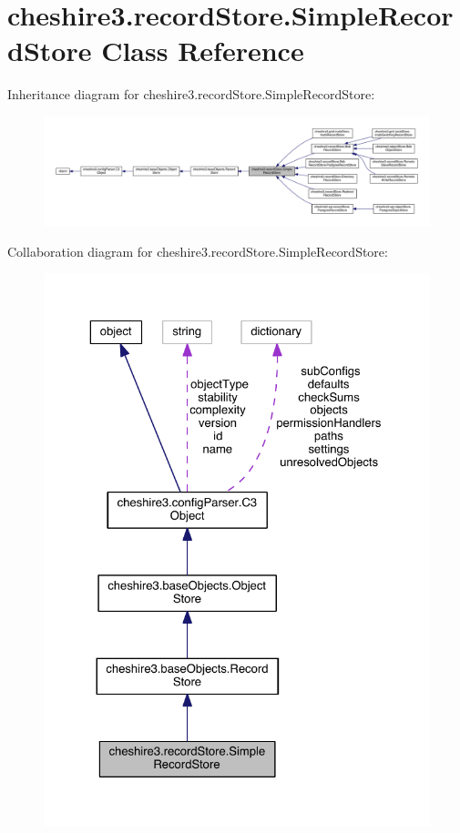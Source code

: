 \hypertarget{classcheshire3_1_1record_store_1_1_simple_record_store}{\section{cheshire3.\-record\-Store.\-Simple\-Record\-Store Class Reference}
\label{classcheshire3_1_1record_store_1_1_simple_record_store}
}


Inheritance diagram for cheshire3.\-record\-Store.\-Simple\-Record\-Store\-:
\nopagebreak
\begin{figure}[H]
\begin{center}
\leavevmode
\includegraphics[width=350pt]{classcheshire3_1_1record_store_1_1_simple_record_store__inherit__graph}
\end{center}
\end{figure}


Collaboration diagram for cheshire3.\-record\-Store.\-Simple\-Record\-Store\-:
\nopagebreak
\begin{figure}[H]
\begin{center}
\leavevmode
\includegraphics[width=325pt]{classcheshire3_1_1record_store_1_1_simple_record_store__coll__graph}
\end{center}
\end{figure}
